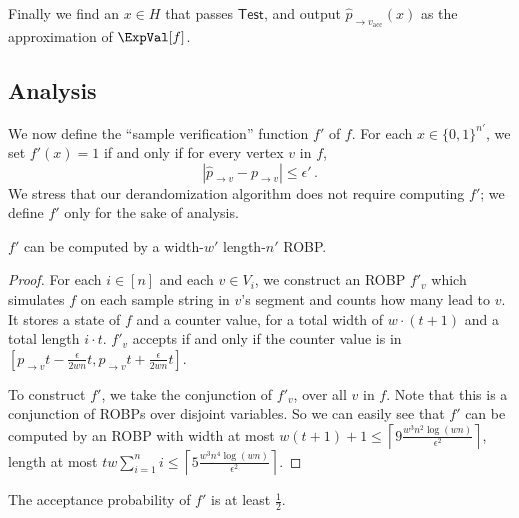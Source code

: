 Finally we find an $x \in H$ that passes $\mathsf{Test}$, and output $\widehat{p}_{\rightarrow v_{\text{acc}}}(x)$ as the approximation of $\ExpVal[f]$.

\subsection{Analysis}

We now define the ``sample verification'' function $f'$ of $f$. For each $x \in \{0, 1\}^{n'}$, we set $f'(x) = 1$ if and only if for every vertex $v$ in $f$,
\begin{equation}
\label{ieq:prhoClose}
\left| \widehat{p}_{\to v} - p_{\to v} \right| \leq   \epsilon'\,. 
\end{equation}
We stress that our derandomization algorithm does not require computing $f'$; we define $f'$ only for the sake of analysis.

\begin{lemma} \label{lem:upgradeROBP}
$f'$ can be computed by a width-$w'$ length-$n'$ ROBP.
\end{lemma}

\begin{proof}
For each $i \in [n]$ and each $v \in V_i$, we construct an ROBP $f'_v$ which simulates $f$ on each sample string in $v$'s segment and counts how many lead to $v$. It stores a state of $f$ and a counter value, for a total width of $w \cdot (t + 1)$ and a total length $i \cdot t$. $f'_v$ accepts if and only if the counter value is in $[p_{\to v}t -\frac{\epsilon}{2wn}t , p_{\to v}t+ \frac{\epsilon}{2wn}t] $.

To construct $f'$, we take the conjunction of $f'_v$, over all $v$ in $f$. Note that this is a conjunction of ROBPs over disjoint variables. So we can easily see that $f'$ can be computed by an  ROBP with width at most $w (t+1) + 1 \leq \left \lceil 9\frac{w^3n^2 \log (wn) }{\epsilon^2} \right \rceil$, length at most $t w \sum_{i=1}^{n } i   \leq \left \lceil 5 \frac{w^3n^4  \log (wn) }{\epsilon^2} \right \rceil$.
\end{proof}

\begin{lemma} \label{lem:acceptProbofUpgradedROBP}
The acceptance probability of $f'$ is at least $\frac{1}{2}$.
\end{lemma}

